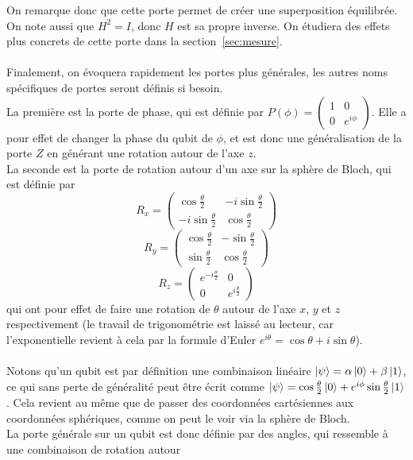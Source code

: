 On remarque donc que cette porte permet de créer une superposition équilibrée.
On note aussi que $H^2 = I$, donc $H$ est sa propre inverse.
On étudiera des effets plus concrets de cette porte dans la section~\ref{sec:mesure}.\\ \\
Finalement, on évoquera rapidement les portes plus générales, les autres noms spécifiques de portes seront définis
si besoin.\\
La première est la porte de phase, qui est définie par $P(\phi) = \begin{pmatrix} 1 & 0 \\ 0 & e^{i \phi} \end{pmatrix}$.
Elle a pour effet de changer la phase du qubit de $\phi$, et est donc une généralisation de la porte $Z$ en générant
une rotation autour de l'axe $z$.\\
La seconde est la porte de rotation autour d'un axe sur la sphère de Bloch, qui est définie par
\[ R_x = \begin{pmatrix} \cos \frac{\theta}{2} & -i \sin \frac{\theta}{2} \\ -i \sin \frac{\theta}{2} & \cos \frac{\theta}{2} \end{pmatrix} \]
\[ R_y = \begin{pmatrix} \cos \frac{\theta}{2} & -\sin \frac{\theta}{2} \\ \sin \frac{\theta}{2} & \cos \frac{\theta}{2} \end{pmatrix} \]
\[ R_z = \begin{pmatrix} e^{-i \frac{\theta}{2}} & 0 \\ 0 & e^{i \frac{\theta}{2}} \end{pmatrix} \]
qui ont pour effet de faire une rotation de $\theta$ autour de l'axe $x$, $y$ et $z$ respectivement
(le travail de trigonométrie est laissé au lecteur, car l'exponentielle revient à cela par la formule d'Euler
$e^{i \theta} = \cos \theta + i \sin \theta$).\\ \\
Notons qu'un qubit est par définition une combinaison linéaire $\ket{\psi} = \alpha \ket{0} + \beta \ket{1}$,
ce qui sans perte de généralité peut être écrit comme $\ket{\psi} = \cos \frac{\theta}{2} \ket{0} + e^{i \phi} \sin \frac{\theta}{2} \ket{1}$.
Cela revient au même que de passer des coordonnées cartésiennes aux coordonnées sphériques, comme on peut le voir
via la sphère de Bloch.\\
La porte générale sur un qubit est donc définie par des angles, qui ressemble à une combinaison de rotation autour
